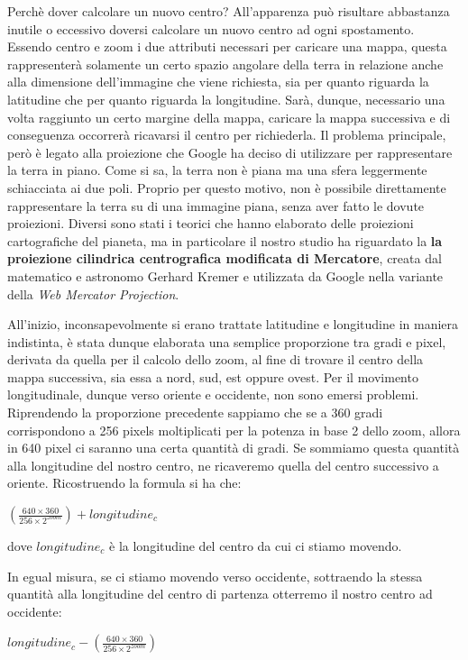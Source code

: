 Perchè dover calcolare un nuovo centro? All'apparenza può risultare abbastanza inutile o eccessivo doversi calcolare un nuovo centro ad ogni spostamento. Essendo centro e zoom i due attributi necessari per caricare una mappa, questa rappresenterà solamente un certo spazio angolare della terra in relazione anche alla dimensione dell'immagine che viene richiesta, sia per quanto riguarda la latitudine che per quanto riguarda la longitudine. Sarà, dunque, necessario una volta raggiunto un certo margine della mappa, caricare la mappa successiva e di conseguenza occorrerà ricavarsi il centro per richiederla. Il problema principale, però è legato alla proiezione che Google ha deciso di utilizzare per rappresentare la terra in piano. Come si sa, la terra non è piana ma una sfera leggermente schiacciata ai due poli. Proprio per questo motivo, non è possibile direttamente rappresentare la terra su di una immagine piana, senza aver fatto le dovute proiezioni. Diversi sono stati i teorici che hanno elaborato delle proiezioni cartografiche del pianeta, ma in particolare il nostro studio ha riguardato la \textbf{la proiezione cilindrica centrografica modificata di Mercatore}, creata dal matematico e astronomo Gerhard Kremer e utilizzata da Google nella variante della \textit{Web Mercator Projection}.

All'inizio, inconsapevolmente si erano trattate latitudine e longitudine in maniera indistinta, è stata dunque elaborata una semplice proporzione tra gradi e pixel, derivata da quella per il calcolo dello zoom, al fine di trovare il centro della mappa successiva, sia essa a nord, sud, est oppure ovest. Per il movimento longitudinale, dunque verso oriente e occidente, non sono emersi problemi. Riprendendo la proporzione precedente sappiamo che se a 360 gradi corrispondono a 256 pixels moltiplicati per la potenza in base 2 dello zoom, allora in 640 pixel ci saranno una certa quantità di gradi. Se sommiamo questa quantità alla longitudine del nostro centro, ne ricaveremo quella del centro successivo a oriente.
Ricostruendo la formula si ha che:
\begin{center}

	\large$ (\frac{640\times360}{256\times2^{zoom}}) + longitudine_{c} $\par

\end{center}
dove $longitudine_{c}$ è la longitudine del centro da cui ci stiamo movendo. 

In egual misura, se ci stiamo movendo verso occidente, sottraendo la stessa quantità alla longitudine del centro di partenza otterremo il nostro centro ad occidente:
\begin{center}

	\large$  longitudine_{c} - (\frac{640\times360}{256\times2^{zoom}}) $\par

\end{center}

